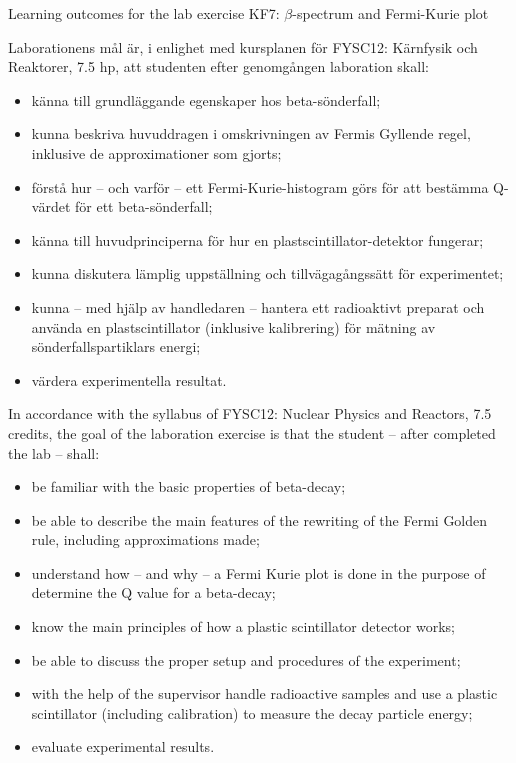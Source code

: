\documentclass[a4,11pt, notitlepage]{report}
\begin{document}
 


\begin{center}
\Large{Learning outcomes for the lab exercise KF7: $\beta$-spectrum and Fermi-Kurie plot}
\end{center}


Laborationens mål är, i enlighet med kursplanen för FYSC12: Kärnfysik och Reaktorer, 7.5 hp, att studenten efter genomgången laboration skall:

\begin{itemize}
\item känna till grundläggande egenskaper hos beta-sönderfall;
\item kunna beskriva huvuddragen i omskrivningen av Fermis
  Gyllende regel, inklusive de approximationer som gjorts;
\item förstå hur -- och varför -- ett Fermi-Kurie-histogram
  görs för att bestämma Q-värdet för ett beta-sönderfall;
\item känna till huvudprinciperna för hur en plastscintillator-detektor fungerar;
 \item kunna diskutera lämplig uppställning och tillvägagångssätt för
   experimentet;
\item kunna -- med hjälp av handledaren -- hantera ett radioaktivt preparat
  och använda en plastscintillator (inklusive kalibrering) för mätning av sönderfallspartiklars energi;
\item värdera experimentella resultat.

\end{itemize}

In accordance with the syllabus of FYSC12: Nuclear Physics and Reactors, 7.5
credits, the goal of the laboration exercise is that the student -- after
completed the lab -- shall:

\begin{itemize}
\item be familiar with the basic properties of beta-decay;
\item be able to describe the main features of the rewriting of the
  Fermi Golden rule, including approximations made;
\item understand how -- and why -- a Fermi Kurie plot is done in the purpose
  of determine the Q value for a beta-decay;
\item know the main principles of how a plastic scintillator detector works;
\item be able to discuss the proper setup and procedures of the experiment;
\item with the help of the supervisor handle radioactive samples and use a
  plastic scintillator (including calibration) to measure the decay particle energy;
\item evaluate experimental results.
\end{itemize}
\end{document}
